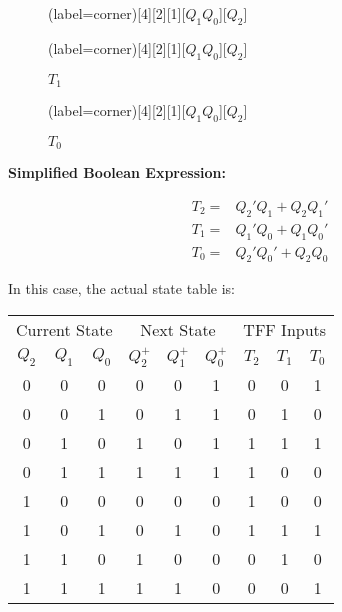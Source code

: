 \documentclass[a4paper,12pt]{article}
\begin{document}
\begin{figure}[H]
	\begin{minipage}{0.5\linewidth}
		\centering
		\begin{karnaugh-map}(label=corner)[4][2][1][$Q_1Q_0$][$Q_2$]
			\autoterms[X]
		\end{karnaugh-map}
		\caption*{$T_2$}
	\end{minipage}
	\begin{minipage}{0.5\linewidth}
		\centering
		\begin{karnaugh-map}(label=corner)[4][2][1][$Q_1Q_0$][$Q_2$]
			\autoterms[X]
		\end{karnaugh-map}
		\caption*{$T_1$}
	\end{minipage}
\end{figure}

\begin{figure}[H]
	\begin{minipage}{0.5\linewidth}
		\centering
		\begin{karnaugh-map}(label=corner)[4][2][1][$Q_1Q_0$][$Q_2$]
			\autoterms[X]
		\end{karnaugh-map}
		\caption*{$T_0$}
	\end{minipage}
\end{figure}

\textbf{Simplified Boolean Expression:}

\begin{align*}
	T_2 =& Q_2'Q_1 + Q_2Q_1' \\
	T_1 =& Q_1'Q_0 + Q_1Q_0' \\
	T_0 =& Q_2'Q_0' + Q_2Q_0
\end{align*}

\newpage
In this case, the actual state table is:
\begin{center}
	\begin{tabular}{ccccccccc}
		\toprule
		\multicolumn{3}{c}{Current State} & \multicolumn{3}{c}{Next State} & \multicolumn{3}{c}{TFF Inputs} \\
		\cmidrule(lr){1-3} \cmidrule(lr){4-6} \cmidrule(lr){7-9}
		$Q_2$ & $Q_1$ & $Q_0$ & $Q_2^+$ & $Q_1^+$ & $Q_0^+$ & $T_2$ & $T_1$ & $T_0$ \\
		\midrule
		0 & 0 & 0 & 0 & 0 & 1 & 0 & 0 & 1 \\ 
        0 & 0 & 1 & 0 & 1 & 1 & 0 & 1 & 0 \\ 
		\rowcolor{red!20}
        0 & 1 & 0 & 1 & 0 & 1 & 1 & 1 & 1 \\ 
        0 & 1 & 1 & 1 & 1 & 1 & 1 & 0 & 0 \\ 
        1 & 0 & 0 & 0 & 0 & 0 & 1 & 0 & 0 \\ 
		\rowcolor{red!20}
        1 & 0 & 1 & 0 & 1 & 0 & 1 & 1 & 1 \\ 
        1 & 1 & 0 & 1 & 0 & 0 & 0 & 1 & 0 \\ 
        1 & 1 & 1 & 1 & 1 & 0 & 0 & 0 & 1 \\ 
		\bottomrule
	\end{tabular}
\end{center}
\end{document}
